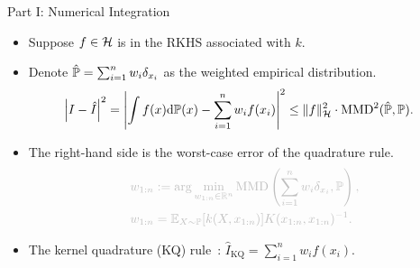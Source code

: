 \documentclass[aspectratio=169,xcolor=dvipsnames]{beamer}
\let\oldcitep\citep
\renewcommand{\citep}[1]{{\scriptsize\textcolor{graytext}{\oldcitep{#1}}}}
\begin{document}
\begin{frame}{Part I: Numerical Integration}
    \begin{itemize}
        \item Suppose $f\in\mathcal{H}$ is in the RKHS associated with $k$.
        \item Denote $\hat{\mathbb{P}}=\sum_{i=1}^n w_i \delta_{x_i}$ as the weighted empirical distribution.
        \begin{align*}
            \left|I - \hat{I} \right|^2 &= \left|\int f(x) \mathrm{d} \mathbb{P}(x) - \sum_{i=1}^n w_i f(x_i)\right|^2
            \leq \|f\|_{\mathcal{H}}^2 \cdot
            \mathrm{MMD}^2(\hat{\mathbb{P}}, \mathbb{P}) .         \end{align*}
    \end{itemize}
    \begingroup
    \color{black!25}
    \begin{itemize}
        \item \textcolor{black!25}{The right-hand side is the worst-case error of the quadrature rule.}
        \begin{align*}
            \color{black!25}w_{1:n} &\color{black!25}:= \arg\min_{w_{1:n}\in\R^n} \mmd\left(\sum_{i=1}^n w_i \delta_{x_i}, \Pb\right), \\ 
            \color{black!25}w_{1:n} &\color{black!25}= \E_{X \sim \Pb}[k(X, x_{1:n})]
            K(x_{1:n},x_{1:n})^{-1} . 
        \end{align*}
        \item \textcolor{black!25}{The kernel quadrature (KQ) rule~{\scriptsize\oldcitep{rasmussen2002bayesian,sommariva2006numerical,briol2019probabilistic}}: $\hat{I}_{\mathrm{KQ}} = \sum_{i=1}^n w_i f(x_i)$.}
    \end{itemize}
    \endgroup
\end{frame}
\end{document}
